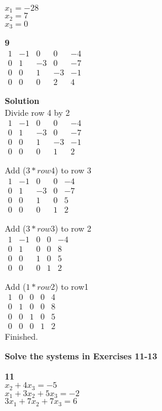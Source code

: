 \documentclass{article}
\begin{document}
$x_{1} = -28$\\
$x_{2} = 7$\\
$x_{3} = 0$

\textbf{9}\\
$
\begin{matrix}
1 & -1 & 0 & 0 & -4\\
0 & 1 & -3 & 0 & -7\\
0 & 0 & 1 & -3 & -1\\
0 & 0 & 0 & 2 & 4
\end{matrix}
$

\textbf{Solution}\\
Divide row 4 by 2\\
$
\begin{matrix}
1 & -1 & 0 & 0 & -4\\
0 & 1 & -3 & 0 & -7\\
0 & 0 & 1 & -3 & -1\\
0 & 0 & 0 & 1 & 2
\end{matrix}
$

Add ($3*row4$) to row 3\\
$
\begin{matrix}
1 & -1 & 0 & 0 & -4\\
0 & 1 & -3 & 0 & -7\\
0 & 0 & 1 & 0 & 5\\
0 & 0 & 0 & 1 & 2
\end{matrix}
$

Add ($3*row3$) to row 2\\
$
\begin{matrix}
1 & -1 & 0 & 0 & -4\\
0 & 1 & 0 & 0 & 8\\
0 & 0 & 1 & 0 & 5\\
0 & 0 & 0 & 1 & 2
\end{matrix}
$

Add ($1*row2$) to row1\\
$
\begin{matrix}
1 & 0 & 0 & 0 & 4\\
0 & 1 & 0 & 0 & 8\\
0 & 0 & 1 & 0 & 5\\
0 & 0 & 0 & 1 & 2
\end{matrix}
$
\\Finished.

\textbf{Solve the systems in Exercises 11-13}

\textbf{11}\\
$x_{2} + 4x_{3} = -5$\\
$x_{1} + 3x_{2} + 5x_{3} = -2$\\
$3x_{1} + 7x_{2} + 7x_{3} = 6$
\end{document}
